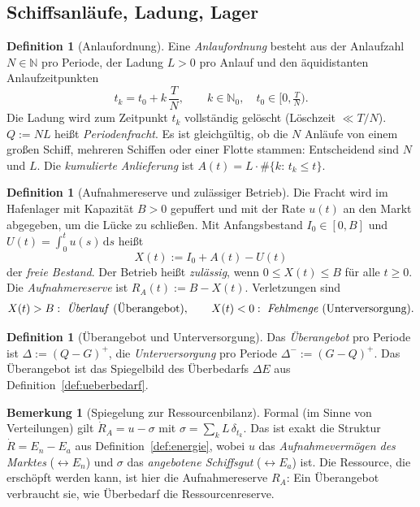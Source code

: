 \documentclass[a4paper, 12pt, twoside, openright]{report}
\theoremstyle{definition}
\newtheorem{definition}[theorem]{Definition}
\theoremstyle{definition}
\newtheorem{bemerkung}{Bemerkung}[chapter]
\newcommand{\N}{\mathbb{N}}
\begin{document}
\subsection{Schiffsanläufe, Ladung, Lager}

\begin{definition}[Anlaufordnung]\label{def:sf-anlauf}
Eine \emph{Anlaufordnung} besteht aus der Anlaufzahl $N\in\N$ pro Periode, der
Ladung $L>0$ pro Anlauf und den äquidistanten Anlaufzeitpunkten
\[
  t_k=t_0+k\,\frac{T}{N},\qquad k\in\N_0,\quad t_0\in\bigl[0,\tfrac{T}{N}\bigr).
\]
Die Ladung wird zum Zeitpunkt $t_k$ vollständig gelöscht (Löschzeit $\ll T/N$).
$Q:=N L$ heißt \emph{Periodenfracht}. Es ist gleichgültig, ob die $N$ Anläufe von einem
großen Schiff, mehreren Schiffen oder einer Flotte stammen: Entscheidend sind $N$ und
$L$. Die \emph{kumulierte Anlieferung} ist $A(t)=L\cdot\#\{k:\,t_k\le t\}$.
\end{definition}

\begin{definition}[Aufnahmereserve und zulässiger Betrieb]\label{def:sf-lager}
Die Fracht wird im Hafenlager mit Kapazität $B>0$ gepuffert und mit der Rate $u(t)$
an den Markt abgegeben, um die Lücke zu schließen. Mit Anfangsbestand
$I_0\in[0,B]$ und $U(t)=\int_0^t u(s)\,\mathrm{d}s$ heißt
\begin{equation}
  X(t):=I_0+A(t)-U(t)
  \label{eq:sf-X}
\end{equation}
der \emph{freie Bestand}. Der Betrieb heißt \emph{zulässig}, wenn $0\le X(t)\le B$
für alle $t\ge0$. Die \emph{Aufnahmereserve} ist $R_A(t):=B-X(t)$.
Verletzungen sind
\[
  X(t)>B:\ \text{\emph{Überlauf} (Überangebot)},\qquad
  X(t)<0:\ \text{\emph{Fehlmenge} (Unterversorgung)} .
\]
\end{definition}

\begin{definition}[Überangebot und Unterversorgung]\label{def:sf-ueberangebot}
Das \emph{Überangebot} pro Periode ist $\Delta:=(Q-G)^+$, die
\emph{Unterversorgung} pro Periode $\Delta^-:=(G-Q)^+$. Das Überangebot ist das
Spiegelbild des Überbedarfs $\Delta E$ aus Definition~\ref{def:ueberbedarf}.
\end{definition}

\begin{bemerkung}[Spiegelung zur Ressourcenbilanz]\label{bem:sf-spiegel}
Formal (im Sinne von Verteilungen) gilt $\dot R_A=u-\sigma$ mit
$\sigma=\sum_k L\,\delta_{t_k}$. Das ist exakt die Struktur $\dot R=E_n-E_a$ aus
Definition~\ref{def:energie}, wobei $u$ das \emph{Aufnahmevermögen des Marktes}
($\leftrightarrow E_n$) und $\sigma$ das \emph{angebotene Schiffsgut}
($\leftrightarrow E_a$) ist. Die Ressource, die erschöpft werden kann, ist hier die
Aufnahmereserve $R_A$: Ein Überangebot verbraucht sie, wie Überbedarf die
Ressourcenreserve.
\end{bemerkung}
\end{document}
